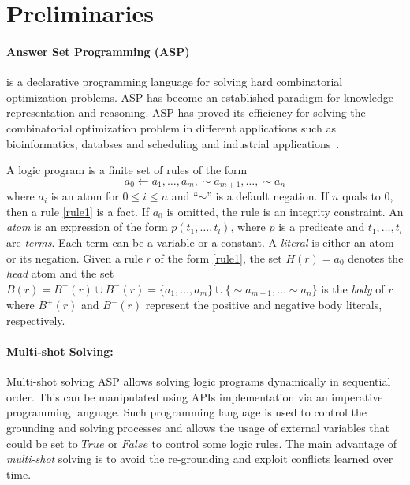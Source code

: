 \documentclass{tlp} %
\begin{document}
\section{Preliminaries}\label{sec:preliminaries}
\paragraph{Answer Set Programming (ASP)} is a declarative programming language for solving hard combinatorial optimization problems. ASP has become an established paradigm for knowledge representation and reasoning. ASP has proved its efficiency for solving the combinatorial optimization problem in different applications such as bioinformatics\cite{erdem2015generating,koponen2015optimizing}, databses\cite{caniupan2010consistency} and scheduling and industrial applications~\cite{dodaro2015allotment,dodaro2016combining,fabricius2020towards,dodaro2021operating}.

A logic program is a finite set of rules of the form 
\begin{equation}
	a_0 \gets a_1, \ldots, a_m, \sim a_{m+1}, \dots, \sim a_n
	\label{rule1}
\end{equation}
where $a_i$ is an atom for $0 \leq i \leq n$ and ``$\sim$''  is a default negation. If $n$ quals to $0$, then a rule \eqref{rule1} is a fact. If $a_0$ is omitted, the rule is an integrity constraint. An \emph{atom} is an expression of the form $p(t_1,\ldots,t_l)$, where $p$ is a predicate and $t_1,\ldots,t_l$ are \emph{terms}. Each term can be a variable or a constant. A \emph{literal} is either an atom or its negation. 
Given a rule $r$ of the form \eqref{rule1}, the set $H(r)=a_0$ denotes the \emph{head} atom and the set $B(r) = B^+(r) \cup B^-(r) = \{a_1,\dots,a_m\} \cup \{\sim a_{m+1}, \dots \sim a_n\}$ is the \emph{body} of $r$ where $B^+(r)$ and $B^+(r)$ represent the positive and negative body literals, respectively.
\paragraph{Multi-shot Solving:}
Multi-shot solving ASP allows solving logic programs dynamically in sequential order. This can be manipulated using APIs implementation via an imperative programming language. Such programming language is used to control the grounding and solving processes and allows the usage of external variables that could be set to $True$ or $False$ to control some logic rules. The main advantage of \emph{multi-shot} solving is to avoid the re-grounding and exploit conflicts learned over time.
\end{document}
